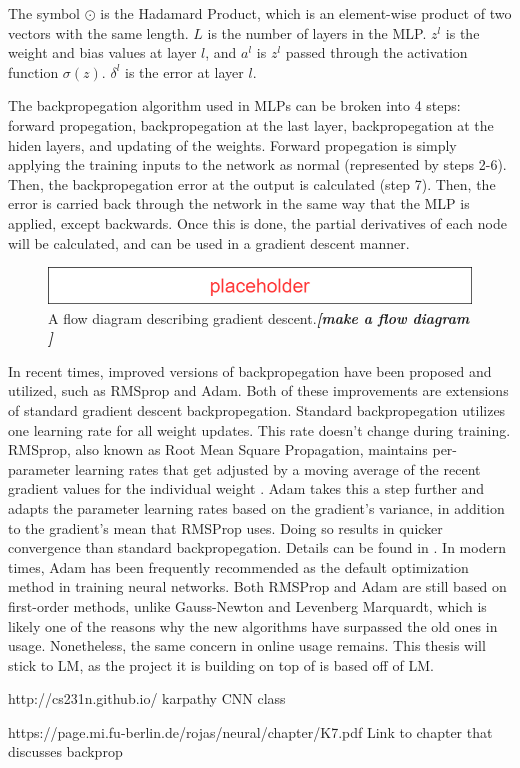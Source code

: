 	\par The symbol $\odot$ is the Hadamard Product, which is an element-wise product of two vectors with the same length. $L$ is the number of layers in the MLP. $z^l$ is the weight and bias values at layer $l$, and $a^l$ is $z^l$ passed through the activation function $\sigma(z)$. $\delta^l$ is the error at layer $l$.
	\par The backpropegation algorithm used in MLPs can be broken into 4 steps: forward propegation, backpropegation at the last layer, backpropegation at the hiden layers, and updating of the weights. 
	Forward propegation is simply applying the training inputs to the network as normal (represented by steps 2-6). Then, the backpropegation error at the output is calculated (step 7). Then, the error is carried back through the network in the same way that the MLP is applied, except backwards. Once this is done, the partial derivatives of each node will be calculated, and can be used in a gradient descent manner. 
	\begin{figure}
		\centering
		\caption{A flow diagram describing gradient descent.\textit{\textbf{[make a flow diagram ]}}}\label{bg:flowBackProp}
		\includegraphics[scale=0.5]{figures/Placeholder.png}
	\end{figure}
	\par In recent times, improved versions of backpropegation have been proposed and utilized, such as RMSprop and Adam. Both of these improvements are extensions of standard gradient descent backpropegation. Standard backpropegation utilizes one learning rate for all weight updates. This rate doesn't change during training. RMSprop, also known as Root Mean Square Propagation, maintains per-parameter learning rates that get adjusted by a moving average of the recent gradient values for the individual weight \cite{RMSPropPaper}. Adam takes this a step further and adapts the parameter learning rates based on the gradient's variance, in addition to the gradient's mean that RMSProp uses. Doing so results in quicker convergence than standard backpropegation. Details can be found in \cite{AdamPaper}. In modern times, Adam has been frequently recommended as the default optimization method in training neural networks\cite{CNNKarpathyClass}. Both RMSProp and Adam are still based on first-order methods, unlike Gauss-Newton and Levenberg Marquardt, which is likely one of the reasons why the new algorithms have surpassed the old ones in usage. Nonetheless, the same concern in online usage remains. This thesis will stick to LM, as the project it is building on top of is based off of LM.
	\par http://cs231n.github.io/ karpathy CNN class
	\par https://page.mi.fu-berlin.de/rojas/neural/chapter/K7.pdf Link to chapter that discusses backprop
